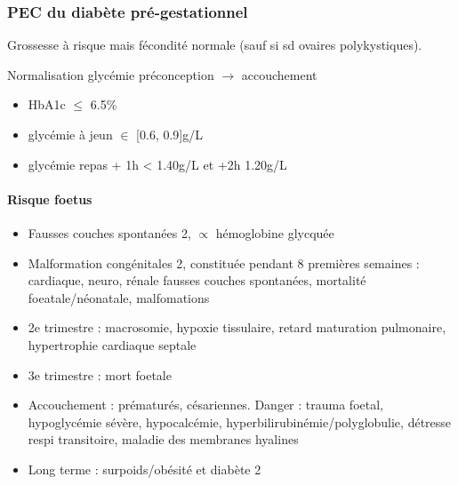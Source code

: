 \documentclass[11pt]{article}
\begin{document}
\subsubsection{PEC du diabète pré-gestationnel}
\label{sec:orga7730cb}
Grossesse à risque mais fécondité normale (sauf si sd ovaires polykystiques).

\danger{} Normalisation glycémie préconception \(\rightarrow\) accouchement
\begin{itemize}
\item HbA1c \(\le\) 6.5\%
\item glycémie à jeun \(\in\) [0.6, 0.9]g/L
\item glycémie repas + 1h < 1.40g/L et +2h 1.20g/L
\end{itemize}

\paragraph{Risque foetus}
\label{sec:org1bfe4da}
\begin{itemize}
\item Fausses couches spontanées \texttimes{}2, \(\propto\) hémoglobine glycquée
\item Malformation congénitales \texttimes{}2, constituée pendant 8 premières semaines :
cardiaque, neuro, rénale \thus \inc fausses couches spontanées, mortalité
foeatale/néonatale, malfomations
\item 2e trimestre : macrosomie, hypoxie tissulaire, retard maturation pulmonaire,
hypertrophie cardiaque septale
\item 3e trimestre : mort foetale
\item Accouchement : \inc prématurés, césariennes. Danger : trauma foetal,
hypoglycémie sévère, hypocalcémie, hyperbilirubinémie/polyglobulie, détresse
respi transitoire, maladie des membranes hyalines
\item Long terme : surpoids/obésité et diabète 2
\end{itemize}
\end{document}
